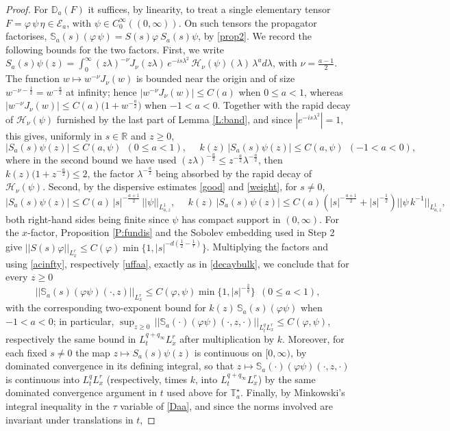 \documentclass[11pt,letter]{amsart}
\def \R {\mathbb{R}}
\def \vf{\varphi}
\newcommand{\la}{\lambda}
\numberwithin{equation}{section}
\numberwithin{equation}{section}
\begin{document}
\begin{proof}
For $\mathbb D_a(F)$ it suffices, by linearity, to treat a single elementary tensor $F = \vf\,\psi\,\eta \in \mathcal E_a$, with $\psi\in C_0^\infty((0,\infty))$. On such tensors the propagator factorises, $\mathbb S_a(s)(\vf\,\psi) = S(s)\vf\ S_a(s)\psi$, by \eqref{prop2}. We record the following bounds for the two factors. First, we write $S_a(s)\psi(z) = \int_0^\infty (z\la)^{-\nu}J_\nu(z\la)\, e^{-is\la^2}\,\mathcal H_\nu(\psi)(\la)\,\la^ad\la$, with $\nu = \frac{a-1}2$. The function $w\mapsto w^{-\nu}J_\nu(w)$ is bounded near the origin and of size $w^{-\nu-\frac12} = w^{-\frac a2}$ at infinity; hence $|w^{-\nu}J_\nu(w)|\le C(a)$ when $0\le a<1$, whereas $|w^{-\nu}J_\nu(w)|\le C(a)\bigl(1+w^{-\frac a2}\bigr)$ when $-1<a<0$. Together with the rapid decay of $\mathcal H_\nu(\psi)$ furnished by the last part of Lemma \ref{L:band}, and since $|e^{-is\la^2}|=1$, this gives, uniformly in $s\in\R$ and $z\ge0$,
\[
|S_a(s)\psi(z)| \le C(a,\psi)\ \ (0\le a<1),\ \ \ \ \ \ k(z)\,|S_a(s)\psi(z)| \le C(a,\psi)\ \ (-1<a<0),
\]
where in the second bound we have used $(z\la)^{-\frac a2}\le z^{-\frac a2}\la^{-\frac a2}$, then $k(z)\bigl(1+z^{-\frac a2}\bigr)\le 2$, the factor $\la^{-\frac a2}$ being absorbed by the rapid decay of $\mathcal H_\nu(\psi)$. Second, by the dispersive estimates \eqref{good} and \eqref{weight}, for $s\neq0$,
\[
|S_a(s)\psi(z)| \le C(a)\,|s|^{-\frac{a+1}2}\,||\psi||_{L^1_{a,z}},\ \ \ \ \ \ k(z)\,|S_a(s)\psi(z)| \le C(a)\left(|s|^{-\frac{a+1}2}+|s|^{-\frac12}\right)||\psi\, k^{-1}||_{L^1_{a,z}},
\]
both right-hand sides being finite since $\psi$ has compact support in $(0,\infty)$. For the $x$-factor, Proposition \ref{P:fundis} and the Sobolev embedding used in Step 2 give $||S(s)\vf||_{L^r_x}\le C(\vf)\min\{1, |s|^{-d(\frac12-\frac1r)}\}$. Multiplying the factors and using \eqref{acinfty}, respectively \eqref{uffaa}, exactly as in \eqref{decaybulk}, we conclude that for every $z\ge0$
\[
||\mathbb S_a(s)(\vf\psi)(\cdot,z)||_{L^r_x} \le C(\vf,\psi) \min\{1,|s|^{-\frac2q}\}\ \ (0\le a<1),
\]
with the corresponding two-exponent bound for $k(z)\,\mathbb S_a(s)(\vf\psi)$ when $-1<a<0$; in particular, $\sup_{z\ge0}\,||\mathbb S_a(\cdot)(\vf\psi)(\cdot,z,\cdot)||_{L^q_tL^r_x}\le C(\vf,\psi)$, respectively the same bound in $L^{q+q_\infty}_tL^r_x$ after multiplication by $k$. Moreover, for each fixed $s\neq0$ the map $z\mapsto S_a(s)\psi(z)$ is continuous on $[0,\infty)$, by dominated convergence in its defining integral, so that $z\mapsto \mathbb S_a(\cdot)(\vf\psi)(\cdot,z,\cdot)$ is continuous into $L^q_tL^r_x$ (respectively, times $k$, into $L^{q+q_\infty}_tL^r_x$) by the same dominated convergence argument in $t$ used above for $\mathbb T^\star_a$. Finally, by Minkowski's integral inequality in the $\tau$ variable of \eqref{Daa}, and since the norms involved are invariant under translations in $t$,

\end{proof}
\end{document}
